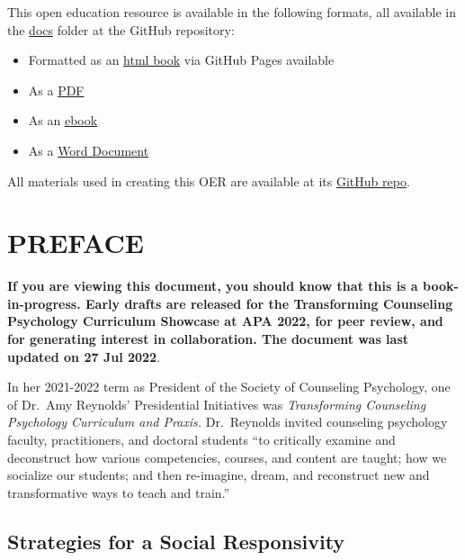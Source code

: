 \documentclass[
  11pt,
]{book}
\providecommand{\tightlist}{%
  \setlength{\itemsep}{0pt}\setlength{\parskip}{0pt}}
\begin{document}
This open education resource is available in the following formats, all available in the \href{https://github.com/lhbikos/TransformingResearchMethods/tree/main/docs}{docs} folder at the GitHub repository:

\begin{itemize}
\tightlist
\item
  Formatted as an \href{https://lhbikos.github.io/TransformingResearchMethods/}{html book} via GitHub Pages available
\item
  As a \href{https://github.com/lhbikos/TransformingResearchMethods/blob/main/docs/TransformingResearchMethods.pdf}{PDF}
\item
  As an \href{https://github.com/lhbikos/TransformingResearchMethods/blob/main/docs/TransformingResearchMethods.epub}{ebook}
\item
  As a \href{https://github.com/lhbikos/TransformingResearchMethods/blob/main/docs/TransformingResearchMethods.docx}{Word Document}
\end{itemize}

All materials used in creating this OER are available at its \href{https://github.com/lhbikos/TransformingResearchMethods}{GitHub repo}.

\hypertarget{preface}{%
\chapter*{PREFACE}\label{preface}}

\textbf{If you are viewing this document, you should know that this is a book-in-progress. Early drafts are released for the Transforming Counseling Psychology Curriculum Showcase at APA 2022, for peer review, and for generating interest in collaboration. The document was last updated on 27 Jul 2022}.

In her 2021-2022 term as President of the Society of Counseling Psychology, one of Dr.~Amy Reynolds' Presidential Initiatives was \emph{Transforming Counseling Psychology Curriculum and Praxis.} Dr.~Reynolds invited counseling psychology faculty, practitioners, and doctoral students ``to critically examine and deconstruct how various competencies, courses, and content are taught; how we socialize our students; and then re-imagine, dream, and reconstruct new and transformative ways to teach and train.''

\hypertarget{strategies-for-a-social-responsivity}{%
\section*{Strategies for a Social Responsivity}\label{strategies-for-a-social-responsivity}}
\end{document}
